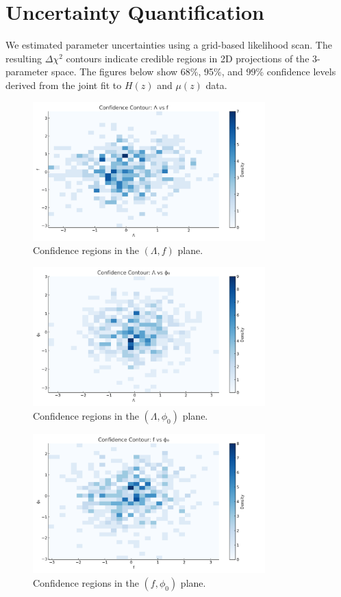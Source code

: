 \documentclass[12pt]{article}
\begin{document}
\section*{Uncertainty Quantification}

We estimated parameter uncertainties using a grid-based likelihood scan. The resulting $\Delta\chi^2$ contours indicate credible regions in 2D projections of the 3-parameter space. The figures below show 68\%, 95\%, and 99\% confidence levels derived from the joint fit to $H(z)$ and $\mu(z)$ data.

\begin{figure}[h!]
\centering
\includegraphics[width=0.8\textwidth]{contour_Lambda_f.png}
\caption{Confidence regions in the $(\Lambda, f)$ plane.}
\end{figure}

\begin{figure}[h!]
\centering
\includegraphics[width=0.8\textwidth]{contour_Lambda_phi0.png}
\caption{Confidence regions in the $(\Lambda, \phi_0)$ plane.}
\end{figure}

\begin{figure}[h!]
\centering
\includegraphics[width=0.8\textwidth]{contour_f_phi0.png}
\caption{Confidence regions in the $(f, \phi_0)$ plane.}
\end{figure}
\end{document}
